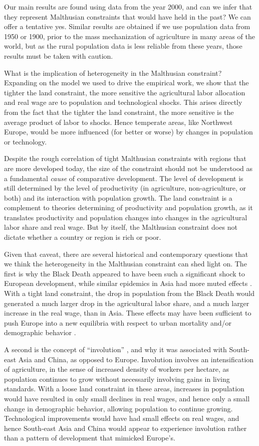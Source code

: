 \documentclass[11pt]{article}
\begin{document}
Our main results are found using data from the year 2000, and can we infer that they represent Malthusian constraints that would have held in the past? We can offer a tentative yes. Similar results are obtained if we use population data from 1950 or 1900, prior to the mass mechanization of agriculture in many areas of the world, but as the rural population data is less reliable from these years, those results must be taken with caution. 

What is the implication of heterogeneity in the Malthusian constraint? Expanding on the model we used to drive the empirical work, we show that the tighter the land constraint, the more sensitive the agricultural labor allocation and real wage are to population and technological shocks. This arises directly from the fact that the tighter the land constraint, the more sensitive is the average product of labor to shocks. Hence temperate areas, like Northwest Europe, would be more influenced (for better or worse) by changes in population or technology.

Despite the rough correlation of tight Malthusian constraints with regions that are more developed today, the size of the constraint should not be understood as a fundamental \textit{cause} of comparative development. The level of development is still determined by the level of productivity (in agriculture, non-agriculture, or both) and its interaction with population growth. The land constraint is a complement to theories determining of productivity and population growth, as it translates productivity and population changes into changes in the agricultural labor share and real wage. But by itself, the Malthusian constraint does not dictate whether a country or region is rich or poor.

Given that caveat, there are several historical and contemporary questions that we think the heterogeneity in the Malthusian constraint can shed light on. The first is why the Black Death appeared to have been such a significant shock to European development, while similar epidemics in Asia had more muted effects \citep{McNeill1976}. With a tight land constraint, the drop in population from the Black Death would generated a much larger drop in the agricultural labor share, and a much larger increase in the real wage, than in Asia. These effects may have been sufficient to push Europe into a new equilibria with respect to urban mortality and/or demographic behavior \citep{vv13,vv08}. 

A second is the concept of ``involution'' \citep{Geertz1963,Huang1990}, and why it was associated with South-east Asia and China, as opposed to Europe. Involution involves an intensification of agriculture, in the sense of increased density of workers per hectare, as population continues to grow without necessarily involving gains in living standards. With a loose land constraint in these areas, increases in population would have resulted in only small declines in real wages, and hence only a small change in demographic behavior, allowing population to continue growing. Technological improvements would have had small effects on real wages, and hence South-east Asia and China would appear to experience involution rather than a pattern of development that mimicked Europe's.
\end{document}
